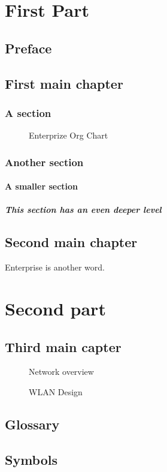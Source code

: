 \documentclass{book}
\begin{document}
\tableofcontents
\listoffigures

\part{First Part}
\chapter{Preface}

\chapter{First main chapter}

\section{A section} %
\begin{figure}
\centering
{}
\caption{ Enterprize Org Chart}
\end{figure}

\section{Another section} %
\subsection{A  smaller section} %
\subsubsection[Deeper level]{This section has an even deeper level} %
\chapter{Second main chapter}

Enterprise is another word.
\part{Second part} %
\chapter{Third main capter}
\begin{figure}
\centering
{}
\caption{ Network overview}
\end{figure}
\begin{figure}
\centering
{}
\caption{WLAN Design}
\end{figure}

\appendix
\cleardoublepage
{}
\chapter{Glossary}
\chapter{Symbols}

\clearpage
{}
\printindex
\end{document}
